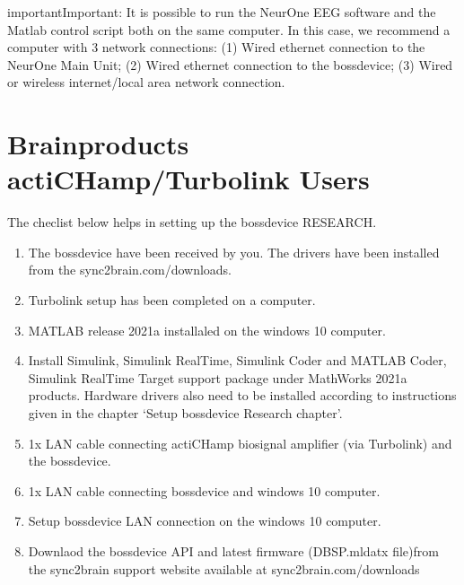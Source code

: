 \documentclass[letterpaper,10pt,english]{sphinxmanual}
\begin{document}
\begin{sphinxadmonition}{important}{Important:}
\sphinxAtStartPar
It is possible to run the NeurOne EEG software and the Matlab control script both on the same computer. In this case, we recommend a computer with 3 network connections: (1) Wired ethernet connection to the NeurOne Main Unit; (2) Wired ethernet connection to the bossdevice; (3) Wired or wireless internet/local area network connection.
\end{sphinxadmonition}


\section{Brainproducts actiCHamp/Turbolink Users}
\label{\detokenize{1b_GettingStartedCheckList:brainproducts-actichamp-turbolink-users}}
\sphinxAtStartPar
The checlist below helps in setting up the bossdevice RESEARCH.
\begin{enumerate}
%
\item {} 
\sphinxAtStartPar
The bossdevice have been received by you. The drivers have been installed from the sync2brain.com/downloads.

\item {} 
\sphinxAtStartPar
Turbolink setup has been completed on a computer.

\item {} 
\sphinxAtStartPar
MATLAB release 2021a installaled on the windows 10 computer.

\item {} 
\sphinxAtStartPar
Install Simulink, Simulink Real\sphinxhyphen{}Time, Simulink Coder and MATLAB Coder, Simulink Real\sphinxhyphen{}Time Target support package under MathWorks 2021a products. Hardware drivers also need to be installed according to instructions given in the chapter ‘Setup bossdevice Research chapter’.

\item {} 
\sphinxAtStartPar
1x LAN cable connecting actiCHamp biosignal amplifier (via Turbolink) and the bossdevice.

\item {} 
\sphinxAtStartPar
1x LAN cable connecting bossdevice and windows 10 computer.

\item {} 
\sphinxAtStartPar
Setup bossdevice LAN connection on the windows 10 computer.

\item {} 
\sphinxAtStartPar
Downlaod the bossdevice API and latest firmware (DBSP.mldatx file)from the sync2brain support website available at sync2brain.com/downloads

\end{enumerate}
\end{document}
